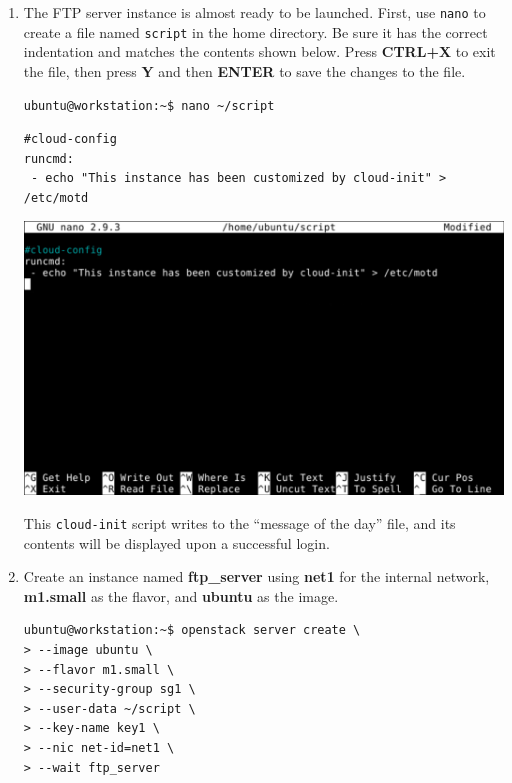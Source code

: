 \documentclass[letterpaper, 12pt]{article}
\begin{document}
\begin{enumerate}
    \item The FTP server instance is almost ready to be launched. First, use \texttt{nano} to create a file named
    \texttt{script} in the home directory. Be sure it has the correct indentation and matches the contents shown below.
    Press \textbf{CTRL+X} to exit the file, then press \textbf{Y} and then \textbf{ENTER} to save the changes to the
    file.
\begin{lstlisting}
ubuntu@workstation:~$ nano ~/script
\end{lstlisting}
\begin{lstlisting}
#cloud-config
runcmd:
 - echo "This instance has been customized by cloud-init" > /etc/motd
\end{lstlisting}

    \begin{center}
        \includegraphics[width=\linewidth]{images/part1/step32.png}
    \end{center}

    \begin{notebox}{}
        This \texttt{cloud-init} script writes to the ``message of the day'' file, and its contents will be displayed
        upon a successful login.
    \end{notebox}

    \item Create an instance named \textbf{ftp\_server} using \textbf{net1} for the internal network, \textbf{m1.small}
    as the flavor, and \textbf{ubuntu} as the image.
\begin{lstlisting}
ubuntu@workstation:~$ openstack server create \
> --image ubuntu \
> --flavor m1.small \
> --security-group sg1 \
> --user-data ~/script \
> --key-name key1 \
> --nic net-id=net1 \
> --wait ftp_server
\end{lstlisting}


\end{enumerate}
\end{document}
